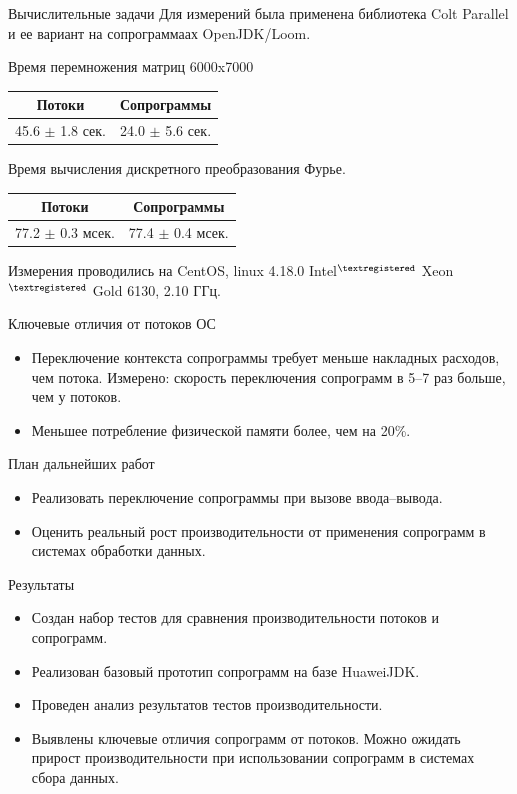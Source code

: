 \begin{frame}{Вычислительные задачи}
	Для измерений была применена библиотека Colt Parallel и
	ее вариант на сопрограммаах OpenJDK/Loom.
	\begin{table}[H]
		Время перемножения матриц 6000x7000
		\begin{tabular}{|c|c|} 
			\hline Потоки              & Сопрограммы           \\
			\hline 45.6 $\pm$ 1.8 сек.   & 24.0 $\pm$ 5.6 сек. \\ 
			\hline
		\end{tabular}
	\end{table}
	\begin{table}[H]
		Время вычисления дискретного преобразования Фурье.
		\begin{tabular}{ |c|c| } 
			\hline Потоки                 & Сопрограммы         \\
			\hline 77.2 $\pm$ 0.3 мсек.   & 77.4 $\pm$ 0.4 мсек.\\ 
			\hline
		\end{tabular}
	\end{table}
	Измерения проводились на CentOS, linux 4.18.0 Intel$^{\textregistered}$  Xeon$^{\textregistered}$ Gold 6130, 2.10 ГГц.
\end{frame}

\begin{frame}{Ключевые отличия от потоков ОС}
	\begin{itemize}
		\item Переключение контекста сопрограммы требует меньше накладных расходов, чем потока. Измерено: скорость переключения сопрограмм в 5--7 раз больше, чем у потоков.
		\item Меньшее потребление физической памяти более, чем на 20\%.
	\end{itemize}
\end{frame}

\begin{frame}{План дальнейших работ} 
	\begin{itemize}
		\item Реализовать переключение сопрограммы при вызове ввода--вывода.
		\item Оценить реальный рост производительности от применения сопрограмм в системах обработки данных.
	\end{itemize}
\end{frame}

\begin{frame}{Результаты}
	\begin{itemize}
		\item Создан набор тестов для сравнения производительности потоков и сопрограмм.
		\item Реализован базовый прототип сопрограмм на базе HuaweiJDK.
		\item Проведен анализ результатов тестов производительности.
		\item Выявлены ключевые отличия сопрограмм от потоков. Можно ожидать прирост
		производительности при использовании сопрограмм в системах сбора данных.
	\end{itemize}
\end{frame}

